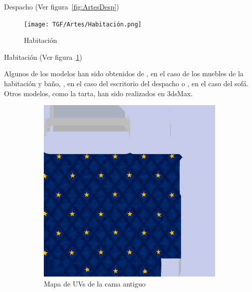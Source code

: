 \documentclass[12pt, a4paper,twoside,titlepage]{book}
\begin{document}
Despacho (Ver figura~\ref{fig:ArtesDesp})

\begin{figure}
	\centering
	\texttt{[image: TGF/Artes/Habitación.png]}
	\caption{Habitación}
	\label{fig:ArtesHab}
\end{figure}

Habitación (Ver figura~\ref{fig:ArtesHab})

Algunos de los modelos han sido obtenidos de \cite{refBedBath}, en el caso de los muebles de la habitación y baño, \cite{refDesk}, en el caso del escritorio del despacho o \cite{refSofa}, en el caso del sofá. Otros modelos, como la tarta, han sido realizados en 3dsMax. 

\begin{figure}
	\centering
	\begin{subfigure}{.5\textwidth}
		\centering
		\includegraphics[width=.95\linewidth]{TGF/Artes/TexBed.png}
		\caption{Mapa de UVs de la cama antiguo}
	\end{subfigure}%
	\begin{subfigure}{.5\textwidth}
		\centering

\end{subfigure}
\end{figure}
\end{document}
